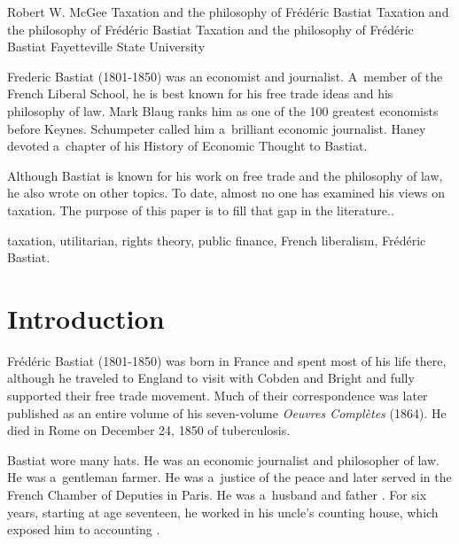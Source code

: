 \begin{artengenv}{Robert W. McGee}
	{Taxation and the philosophy of Frédéric Bastiat}
	{Taxation and the philosophy of Frédéric Bastiat}
	{Taxation and the philosophy of Frédéric Bastiat}
	{Fayetteville State University}
	{Frederic Bastiat (1801-1850) was an economist and journalist. A~member of the French Liberal School, he is best known for his free trade ideas and his philosophy of law. Mark Blaug ranks him as one of the 100 greatest economists before Keynes. Schumpeter called him a~brilliant economic journalist. Haney devoted a~chapter of his History of Economic Thought to Bastiat.
	
	
	
	Although Bastiat is known for his work on free trade and the philosophy of law, he also wrote on other topics. To date, almost no one has examined his views on taxation. The purpose of this paper is to fill that gap in the literature..
	}
	{taxation, utilitarian, rights theory, public finance, French liberalism, Frédéric Bastiat.}






\section{Introduction}

\lettrine[loversize=0.13,lines=2,lraise=-0.03,nindent=0em,findent=0.2pt]%
{F}{}rédéric Bastiat (1801-1850) was born in France and spent most of his life there, although he traveled to England to visit with Cobden and Bright and fully supported their free trade movement. Much of their correspondence was later published as an entire volume of his seven-volume \textit{Oeuvres Complètes} (1864). He died in Rome on December 24, 1850 of tuberculosis.



Bastiat wore many hats. He was an economic journalist and philosopher of law. He was a~gentleman farmer. He was a~justice of the peace and later served in the French Chamber of Deputies in Paris. He was a~husband and father 
\parencites[][]{bidet_frederic_1906}[][]{bastiat_f_1889}[][]{haney_history_1949}[][]{imbert_frederic_1913}[][]{nouvion_frederic_1905}[][]{roche_frederic_1971}[][]{roche_free_1993}[][]{ronce_frederic_1905}[][]{russell_frederic_1959}[][]{russell_frederic_1969}. %
 For six years, starting at age seventeen, he worked in his uncle's counting house, which exposed him to accounting 
\parencite[][p.xi]{bastiat_introduction_1964}.%





\end{artengenv}
